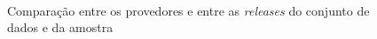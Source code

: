 \begin {figure} [h!]
   \centering
   \mbox {
        \quad
    }
    \caption{Comparação entre os provedores e entre as \textit{releases} do conjunto de dados e da amostra}
    \label{fig:violin}
\end{figure}

